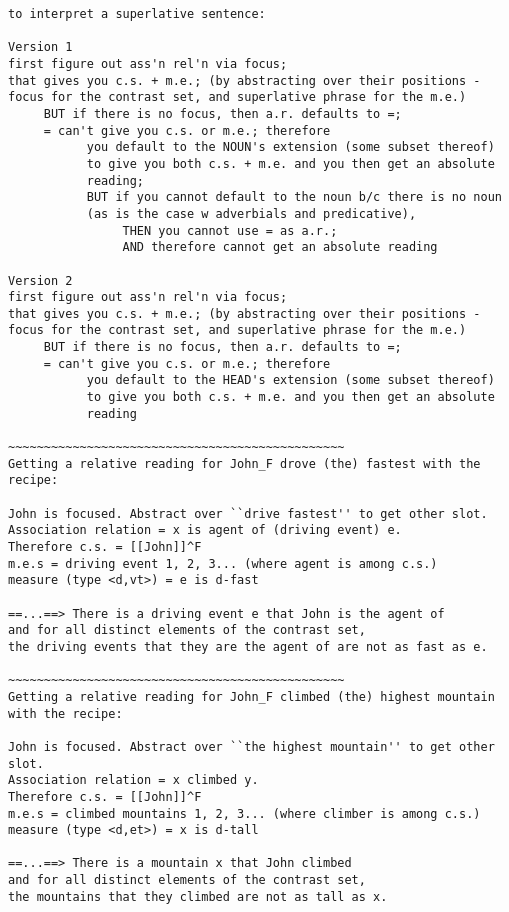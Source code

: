 \documentclass{article}
\begin{document}
  
\begin{verbatim}
to interpret a superlative sentence: 

Version 1
first figure out ass'n rel'n via focus;
that gives you c.s. + m.e.; (by abstracting over their positions -
focus for the contrast set, and superlative phrase for the m.e.) 
     BUT if there is no focus, then a.r. defaults to =;
     = can't give you c.s. or m.e.; therefore
           you default to the NOUN's extension (some subset thereof)
           to give you both c.s. + m.e. and you then get an absolute
           reading;
           BUT if you cannot default to the noun b/c there is no noun
           (as is the case w adverbials and predicative),
                THEN you cannot use = as a.r.; 
                AND therefore cannot get an absolute reading

Version 2
first figure out ass'n rel'n via focus;
that gives you c.s. + m.e.; (by abstracting over their positions -
focus for the contrast set, and superlative phrase for the m.e.) 
     BUT if there is no focus, then a.r. defaults to =;
     = can't give you c.s. or m.e.; therefore
           you default to the HEAD's extension (some subset thereof)
           to give you both c.s. + m.e. and you then get an absolute
           reading

~~~~~~~~~~~~~~~~~~~~~~~~~~~~~~~~~~~~~~~~~~~~~~~
Getting a relative reading for John_F drove (the) fastest with the recipe:

John is focused. Abstract over ``drive fastest'' to get other slot.
Association relation = x is agent of (driving event) e.
Therefore c.s. = [[John]]^F
m.e.s = driving event 1, 2, 3... (where agent is among c.s.)
measure (type <d,vt>) = e is d-fast

==...==> There is a driving event e that John is the agent of
and for all distinct elements of the contrast set, 
the driving events that they are the agent of are not as fast as e.

~~~~~~~~~~~~~~~~~~~~~~~~~~~~~~~~~~~~~~~~~~~~~~~
Getting a relative reading for John_F climbed (the) highest mountain with the recipe:

John is focused. Abstract over ``the highest mountain'' to get other slot.
Association relation = x climbed y.
Therefore c.s. = [[John]]^F
m.e.s = climbed mountains 1, 2, 3... (where climber is among c.s.)
measure (type <d,et>) = x is d-tall

==...==> There is a mountain x that John climbed
and for all distinct elements of the contrast set, 
the mountains that they climbed are not as tall as x.


\end{verbatim}
\end{document}
